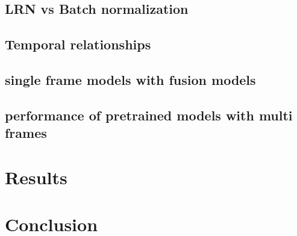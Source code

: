 \documentclass{article}
\begin{document}
    \subsection{LRN vs Batch normalization}
    \subsection{Temporal relationships}
    \subsection{single frame models with fusion models}
    \subsection{performance of pretrained models with multi frames}


    \section{Results}


    \section{Conclusion}


    
    
\end{document}
